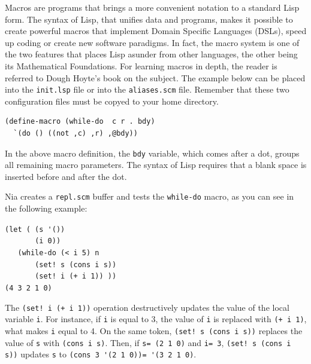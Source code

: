 \documentclass[a4paper,12pt]{book}
\newenvironment{fmpage}[1]
               {\begin{lrbox}{\fmbox}\begin{minipage}{#1}}
               {\end{minipage}\end{lrbox}\fbox{\usebox{\fmbox}}}
\begin{document}
 Macros are programs that brings a more convenient
 notation to a standard Lisp form. The syntax of Lisp,
 that unifies data and programs, makes it possible to
 create powerful macros that implement Domain Specific
 Languages (DSLs), speed up coding or create new software
 paradigms. In fact, the macro system is one of the
 two features that places Lisp asunder from other
 languages, the other being its Mathematical Foundations.
 For learning macros in depth, the reader is referred to
 Dough Hoyte's book on the subject\cite{Hoyte}.
 The example below can be placed into the
 \verb|init.lsp| file or into the \verb|aliases.scm|
 file. Remember that these two configuration
 files must be copyed to your home directory.

\begin{verbatim}
(define-macro (while-do  c r . bdy)
  `(do () ((not ,c) ,r) ,@bdy))
\end{verbatim}

In the above macro definition,
the  \verb|bdy| variable, which
comes after a dot, groups all
remaining macro parameters.
The syntax of Lisp requires that
a blank space is inserted before
and after the dot.

Nia creates a \verb|repl.scm| buffer
and tests the \verb|while-do| macro,
as you can see in the following example:\\

\begin{fmpage}{0.8\linewidth}
\verb|(let ( (s '())|\\
\verb|       (i 0))|\\
\verb|   (while-do (< i 5) n|\\
\verb|       (set! s (cons i s))|\\
\verb|       (set! i (+ i 1)) ))| \keys{~]~}\\
\verb|(4 3 2 1 0)|\\
\end{fmpage}

\begin{fmpage}{0.8\linewidth}
\verb||
\end{fmpage}

\vspace{0.5cm}
The \verb|(set! i (+ i 1))| operation
destructively updates the value
of the local variable \verb|i|.
For instance, if \verb|i| is
equal to 3, the value of \verb|i|
is replaced with \verb|(+ i 1)|,
what makes \verb|i| equal to 4.
On the same token, \verb|(set! s (cons i s))|
replaces the value of \verb|s| with
\verb|(cons i s)|. Then, if \verb|s= (2 1 0)|
and \verb|i= 3|,
\verb|(set! s (cons i s))| updates \verb|s|
to \verb|(cons 3 '(2 1 0))= '(3 2 1 0)|.
\end{document}
